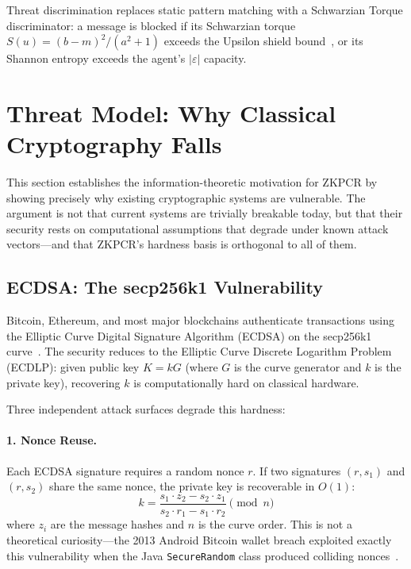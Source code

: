 \documentclass[12pt,a4paper]{article}
\begin{document}
Threat discrimination replaces static pattern matching with a Schwarzian Torque discriminator: a message is blocked if its Schwarzian torque $S(u) = (b-m)^2/(a^2+1)$ exceeds the Upsilon shield bound~\cite{PP-I-Ch11}, or its Shannon entropy exceeds the agent's $|\varepsilon|$ capacity.

\section{Threat Model: Why Classical Cryptography Falls}
\label{sec:threat-model}

This section establishes the information-theoretic motivation for ZKPCR by showing precisely why existing cryptographic systems are vulnerable. The argument is not that current systems are trivially breakable today, but that their security rests on computational assumptions that degrade under known attack vectors---and that ZKPCR's hardness basis is orthogonal to all of them.

\subsection{ECDSA: The secp256k1 Vulnerability}
\label{subsec:ecdsa}

Bitcoin, Ethereum, and most major blockchains authenticate transactions using the Elliptic Curve Digital Signature Algorithm (ECDSA) on the secp256k1 curve~\cite{bitcoin2008}. The security reduces to the Elliptic Curve Discrete Logarithm Problem (ECDLP): given public key $K = kG$ (where $G$ is the curve generator and $k$ is the private key), recovering $k$ is computationally hard on classical hardware.

Three independent attack surfaces degrade this hardness:

\paragraph{1. Nonce Reuse.} Each ECDSA signature requires a random nonce $r$. If two signatures $(r, s_1)$ and $(r, s_2)$ share the same nonce, the private key is recoverable in $O(1)$:
\begin{equation}
k = \frac{s_1 \cdot z_2 - s_2 \cdot z_1}{s_2 \cdot r_1 - s_1 \cdot r_2} \pmod{n}
\end{equation}
where $z_i$ are the message hashes and $n$ is the curve order. This is not a theoretical curiosity---the 2013 Android Bitcoin wallet breach exploited exactly this vulnerability when the Java \texttt{SecureRandom} class produced colliding nonces~\cite{breitner2019biased}.
\end{document}
